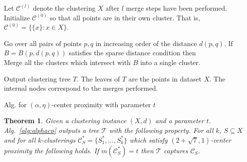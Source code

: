 \documentclass[12pt]{article}
\newtheorem{theorem}{Theorem}
\newcommand{\mc}{\mathcal}
\begin{document}
\begin{algorithm}
\Indp{}
	
\vspace{0.1in} Let $\mc C^{(l)}$ denote the clustering $X$ after $l$ merge steps have been performed. Initialize $\mc C^{(0)}$ so that all points are in their own cluster. That is, $\mc C^{(0)} = \{ \{x\}: x \in X\}$.
	
	Go over all pairs of points $p, q$ in increasing order of the distance $d(p, q)$. If $B = B(p, d(p, q))$ satisfies the sparse distance condition then\\
	Merge all the clusters which intersect with $B$ into a single cluster.
	
	\vspace{0.1in}Output clustering tree $T$. The leaves of $T$ are the points in dataset $X$. The internal nodes correspond to the merges performed.
\caption{Alg. for $(\alpha, \eta)$-center proximity with parameter $t$}	
\label{alg:alphacp}
\end{algorithm}
\vspace{-.1in}
\begin{theorem}
\label{thm:alphacpnoise}
Given a clustering instance $(X, d)$ and a parameter $t$. Alg.~\ref{alg:alphacp} outputs a tree $\mc T$ with the following property. For all $k$, $S \subseteq X$ and for all $k$-clusterings $\mc C^*_{S} = \{S_1^*, \ldots, S_k^*\}$ which satisfy $(2+\sqrt{7}, 1)$-center proximity the following holds. If $m(\mc C_{S}^*) = t$ then $\mc T$ captures $\mc C_{S}$.
\end{theorem}
\end{document}
